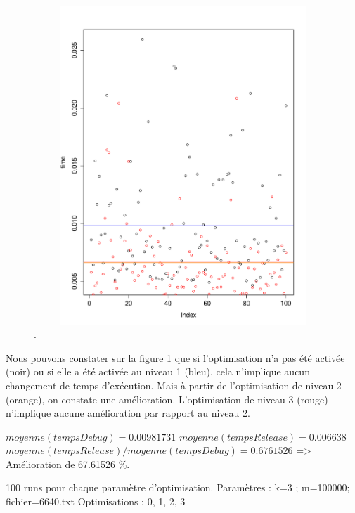 

\begin{figure}[htbp]
	\begin{center}
		\includegraphics[width=12cm,height=12cm]{diagrams/time_optimisation.pdf}
		\caption{.}
		\label{fig:timeOptimisation}
	\end{center}
\end{figure}

Nous pouvons constater sur la figure \ref{fig:timeOptimisation} que si l'optimisation n'a pas été activée (noir) ou si elle a été activée au niveau 1 (bleu), cela n'implique aucun changement de temps d'exécution. Mais à partir de l'optimisation de niveau 2 (orange), on constate une amélioration. L'optimisation de niveau 3 (rouge) n'implique aucune amélioration par rapport au niveau 2.


$moyenne(tempsDebug) = 0.00981731$
$moyenne(tempsRelease) = 0.006638$
$moyenne(tempsRelease) / moyenne(tempsDebug) = 0.6761526$ => Amélioration de 67.61526 \%.

100 runs pour chaque paramètre d'optimisation.
Paramètres : k=3 ; m=100000; fichier=6640.txt
Optimisations : 0, 1, 2, 3

